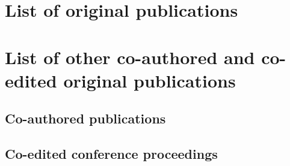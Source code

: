 
\chapter*{List of original publications}

\begin{list}{}{}

%

\end{list}

\chapter*{List of other co-authored and co-edited original publications}

\section*{Co-authored publications}

\renewcommand{\mybibitem}[2][x]{\item}

\begin{itemize}
%
\end{itemize}
\section*{Co-edited conference proceedings}

